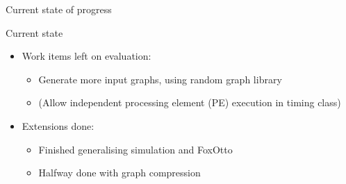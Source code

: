 \documentclass{beamer}
\begin{document}
\begin{frame}{Current state of progress}
\begin{block}{Current state}
\begin{itemize}
        \item Work items left on evaluation:
            \begin{itemize}
                \item Generate more input graphs, using random graph library
                \item (Allow independent processing element (PE) execution in timing class)
            \end{itemize}
        \item Extensions done:
            \begin{itemize}
                \item Finished generalising simulation and FoxOtto
                \item Halfway done with graph compression
            \end{itemize}
    \end{itemize}
\end{block}
\end{frame}
\end{document}
